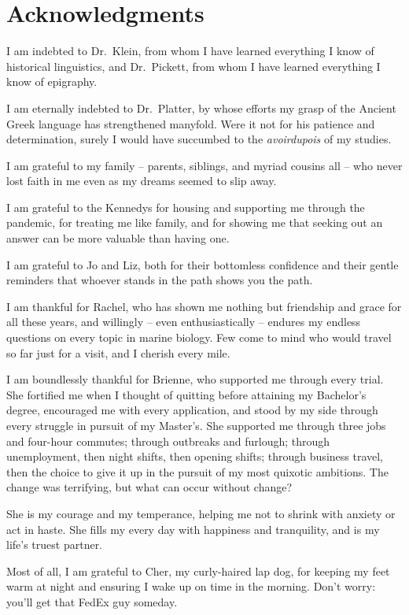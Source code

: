 \documentclass[./dissertation.tex]{subfiles}
\begin{document}
  \chapter*{Acknowledgments}


I am indebted to Dr.\ Klein, from whom I have learned everything I know of historical linguistics, and Dr.\ Pickett, from whom I have learned everything I know of epigraphy.
\vspace*{1\baselineskip}

{\noindent}I am eternally indebted to Dr.\ Platter, by whose efforts my grasp of the Ancient Greek language has strengthened manyfold. Were it not for his patience and determination, surely I would have succumbed to the \textit{avoirdupois} of my studies.
\vspace*{1\baselineskip}

{\noindent}I am grateful to my family -- parents, siblings, and myriad cousins all -- who never lost faith in me even as my dreams seemed to slip away.
\vspace*{1\baselineskip}

{\noindent}I am grateful to the Kennedys for housing and supporting me through the pandemic, for treating me like family, and for showing me that seeking out an answer can be more valuable than having one.
\vspace*{1\baselineskip}

{\noindent}I am grateful to Jo and Liz, both for their bottomless confidence and their gentle reminders that whoever stands in the path shows you the path.
\vspace*{1\baselineskip}

{\noindent}I am thankful for Rachel, who has shown me nothing but friendship and grace for all these years, and willingly -- even enthusiastically -- endures my endless questions on every topic in marine biology. Few come to mind who would travel so far just for a visit, and I cherish every mile.
\vspace*{1\baselineskip}

{\noindent}I am boundlessly thankful for Brienne, who supported me through every trial. She fortified me when I thought of quitting before attaining my Bachelor's degree, encouraged me with every application, and stood by my side through every struggle in pursuit of my Master's. She supported me through three jobs and four-hour commutes; through outbreaks and furlough; through unemployment, then night shifts, then opening shifts; through business travel, then the choice to give it up in the pursuit of my most quixotic ambitions. The change was terrifying, but what can occur without change?

She is my courage and my temperance, helping me not to shrink with anxiety or act in haste. She fills my every day with happiness and tranquility, and is my life's truest partner.
\vspace*{1\baselineskip}

{\noindent}Most of all, I am grateful to Cher, my curly-haired lap dog, for keeping my feet warm at night and ensuring I wake up on time in the morning. Don't worry: you'll get that FedEx guy someday.
\end{document}
